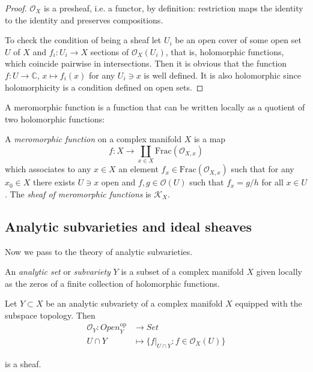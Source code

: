 \begin{proof}
$\mathcal{O}_X$ is a presheaf,
i.e. a functor,
by definition: restriction
maps the identity to the identity
and preserves compositions.

To check the condition of being a sheaf let
$U_i$ be an open cover of some open set $U$
of $X$
and $f_i:U_i \to X$ sections of
$\mathcal{O}_X(U_i)$,
that is, holomorphic functions, which
coincide pairwise in intersections.
Then it is obvious that the function $f:U \to
\mathbb{C}$,
$x \mapsto f_i(x)$ for any $U_i \ni x$
is well defined. It is also holomorphic
since holomorphicity is a condition defined
on
open sets.
\end{proof}

\medskip\noindent
A meromorphic function is a function that
can be written locally as a quotient of two
holomorphic functions:

\begin{definition}
\label{definition-meromorphic-functions}
\begin{reference}
\cite[Definition 2.1.8]{huc}
\end{reference}
A {\it meromorphic function} on a complex
manifold $X$
is a map
$$
f:X \to \coprod_{x \in
X}\text{Frac}(\mathcal{O}_{X,x})
$$
which associates to any $x\in X$
an element $f_x \in
\text{Frac}(\mathcal{O}_{X,x})$
such that for any $x_0 \in X$
there exists $U\ni x$ open and $f,g
\in\mathcal{O}(U)$
such that $f_x=g/h$ for all $x \in U$.
The {\it sheaf of meromorphic functions} is
$\mathcal{K}_X$.
\end{definition}


\subsection{Analytic subvarieties and ideal
sheaves}
\label{subsection-analytic-subvarieties}

\medskip\noindent
Now we pass to the theory of analytic
subvarieties.

\begin{definition}
\label{definition-analytic-subvariety}
An {\it analytic set} or {\it subvariety} $Y$
is a subset of a complex manifold $X$
given locally as the zeros of a finite
collection of holomorphic functions.
\end{definition}

\begin{lemma}
\label{lemma-structure-sheaf-of-subvariety}
Let $Y \subset X$ be an analytic subvariety
of a complex manifold $X$
equipped with the subspace topology.
Then
$$
\begin{aligned}
\mathcal{O}_Y: \mathit{Open}_Y^{\text{op}}
&\longrightarrow \mathit{Set} \\
U\cap Y &\longmapsto \{f|_{U \cap Y}:f \in
\mathcal{O}_X(U)\}
\end{aligned}
$$

\noindent
is a sheaf.
\end{lemma}

